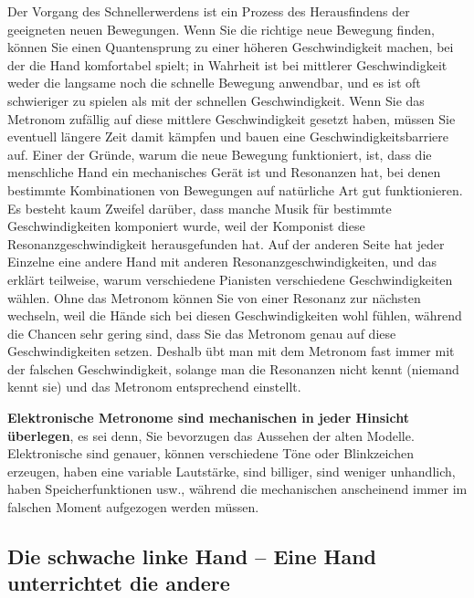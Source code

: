 Der Vorgang des Schnellerwerdens ist ein Prozess des Herausfindens der geeigneten neuen Bewegungen.
Wenn Sie die richtige neue Bewegung finden, können Sie einen Quantensprung zu einer höheren Geschwindigkeit machen, bei der die Hand komfortabel spielt; in Wahrheit ist bei mittlerer Geschwindigkeit weder die langsame noch die schnelle Bewegung anwendbar, und es ist oft schwieriger zu spielen als mit der schnellen Geschwindigkeit.
Wenn Sie das Metronom zufällig auf diese mittlere Geschwindigkeit gesetzt haben, müssen Sie eventuell längere Zeit damit kämpfen und bauen eine Geschwindigkeitsbarriere auf.
Einer der Gründe, warum die neue Bewegung funktioniert, ist, dass die menschliche Hand ein mechanisches Gerät ist und Resonanzen hat, bei denen bestimmte Kombinationen von Bewegungen auf natürliche Art gut funktionieren.
Es besteht kaum Zweifel darüber, dass manche Musik für bestimmte Geschwindigkeiten komponiert wurde, weil der Komponist diese Resonanzgeschwindigkeit herausgefunden hat.
Auf der anderen Seite hat jeder Einzelne eine andere Hand mit anderen Resonanzgeschwindigkeiten, und das erklärt teilweise, warum verschiedene Pianisten verschiedene Geschwindigkeiten wählen.
Ohne das Metronom können Sie von einer Resonanz zur nächsten wechseln, weil die Hände sich bei diesen Geschwindigkeiten wohl fühlen, während die Chancen sehr gering sind, dass Sie das Metronom genau auf diese Geschwindigkeiten setzen.
Deshalb übt man mit dem Metronom fast immer mit der falschen Geschwindigkeit, solange man die Resonanzen nicht kennt (niemand kennt sie) und das Metronom entsprechend einstellt.

\textbf{Elektronische Metronome sind mechanischen in jeder Hinsicht überlegen}, es sei denn, Sie bevorzugen das Aussehen der alten Modelle.
Elektronische sind genauer, können verschiedene Töne oder Blinkzeichen erzeugen, haben eine variable Lautstärke, sind billiger, sind weniger unhandlich, haben Speicherfunktionen usw., während die mechanischen anscheinend immer im falschen Moment aufgezogen werden müssen.


\subsection{Die schwache linke Hand -- Eine Hand unterrichtet die andere}
\label{c1ii20}

